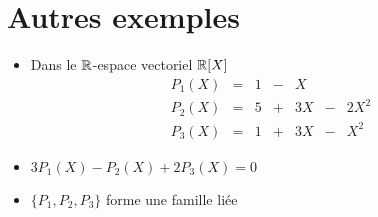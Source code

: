 \section{Autres exemples}

\begin{frame}
\begin{exemple}
\begin{itemize}
\item
Dans le $\mathbb{R}$-espace vectoriel $\mathbb{R}[X]$
$$
\begin{matrix}
P_1(X)&=&1&-&X & &\\
P_2(X)&=&5&+&3X&-&2X^2\\
P_3(X)&=&1&+&3X&-&X^2
\end{matrix}
$$
\pause
\item $3P_1(X) - P_2(X) + 2P_3(X) = 0$
\pause
\item
$\{P_1, P_2, P_3\}$ forme une famille liée 
\end{itemize}
\end{exemple}
\end{frame}




